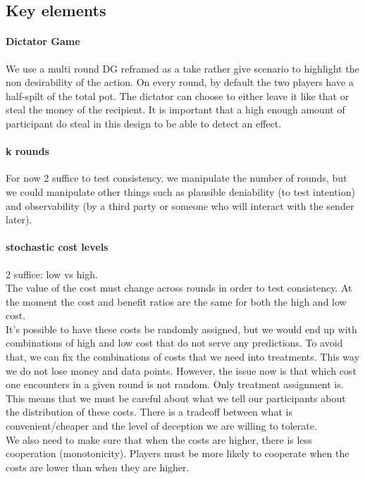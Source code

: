 \documentclass[11pt]{article}
\theoremstyle{plainCl1}
\begin{document}
\subsection{Key elements}

\paragraph{Dictator Game}
We use a multi round DG reframed as a take rather give scenario to highlight the non desirability of the action. 
On every round, by default the two players have a half-spilt of the total pot. 
The dictator can choose to either leave it like that or steal the money of the recipient. It is important that a high enough amount of participant do steal in this design to be able to detect an effect.

\paragraph{k rounds}
For now 2 suffice to test consistency. 
we manipulate the number of rounds, but we could manipulate other things such as plausible deniability (to test intention) 
and observability (by a third party or someone who will interact with the sender later).\

\paragraph{stochastic cost levels}
2 suffice: low vs high. \\
The value of the cost must change across rounds in order to test consistency. 
At the moment the cost and benefit ratios are the same for both the high and low cost. \\
It's possible to have these costs be randomly assigned, but we would end up with combinations of high and low cost that do not serve any predictions. 
To avoid that, we can fix the combinations of costs that we need into treatments. This way we do not lose money and data points. 
However, the issue now is that which cost one encounters in a given round is not random. Only treatment assignment is. 
This means that we must be careful about what we tell our participants about the distribution of these costs. 
There is a tradeoff between what is convenient/cheaper and the level of deception we are willing to tolerate.\\
We also need to make sure that when the costs are higher, there is less cooperation (monotonicity).
Players must be more likely to cooperate when the costs are lower than when they are higher. 
\end{document}
